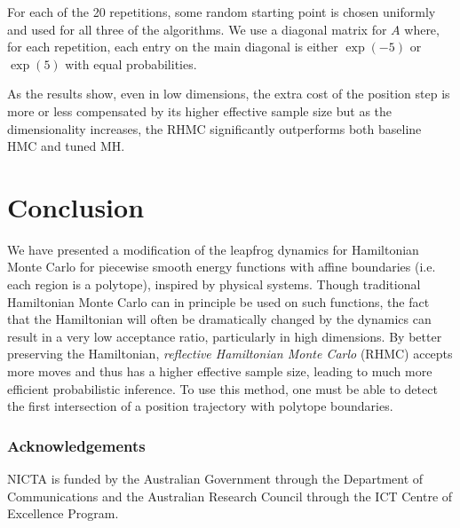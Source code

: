 \documentclass{article} %
\begin{document}
For each of the 20 repetitions, some random starting point is chosen uniformly and used for all three of the algorithms.  We use a diagonal matrix for $A$ where, for each repetition, each entry on the main diagonal is either $\exp(-5)$ or $\exp(5)$ with equal probabilities.

As the results show, even in low dimensions, the extra cost of the position step is more or less compensated by its higher effective sample size but as the dimensionality increases, the RHMC significantly outperforms both baseline HMC and tuned MH.

\section{Conclusion}
\vspace{-10pt}

We have presented a modification of the leapfrog dynamics for Hamiltonian Monte Carlo for piecewise smooth energy functions with affine boundaries (i.e. each region is a polytope), inspired by physical systems.  Though traditional Hamiltonian Monte Carlo can in principle be used on such functions, the fact that the Hamiltonian will often be dramatically changed by the dynamics can result in a very low acceptance ratio, particularly in high dimensions.  By better preserving the Hamiltonian, \emph{reflective Hamiltonian Monte Carlo} (RHMC) accepts more moves and thus has a higher effective sample size, leading to much more efficient probabilistic inference.  To use this method, one must be able to detect the first intersection of a position trajectory with polytope boundaries.


\subsubsection*{Acknowledgements}
NICTA is funded by the Australian Government through the Department of Communications and the Australian Research Council through the ICT Centre of Excellence Program.







\end{document}
